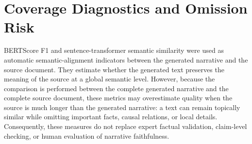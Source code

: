 \documentclass{article}
\begin{document}
\section{Coverage Diagnostics and Omission Risk}
BERTScore F1 and sentence-transformer semantic similarity were used as automatic semantic-alignment indicators between the generated narrative and the source document. They estimate whether the generated text preserves the meaning of the source at a global semantic level. However, because the comparison is performed between the complete generated narrative and the complete source document, these metrics may overestimate quality when the source is much longer than the generated narrative: a text can remain topically similar while omitting important facts, causal relations, or local details. Consequently, these measures do not replace expert factual validation, claim-level checking, or human evaluation of narrative faithfulness.
\end{document}
